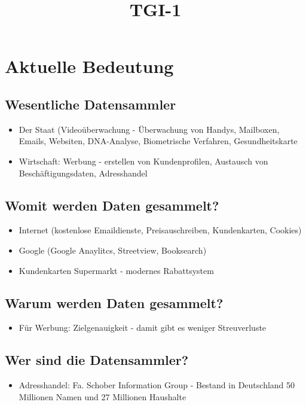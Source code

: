 \documentclass[a4paper,10pt]{scrartcl}
\title{TGI-1}
\author{}
\begin{document}
\section{Aktuelle Bedeutung}

\subsection{Wesentliche Datensammler}

\begin{itemize}
 \item Der Staat (Videoüberwachung - Überwachung von Handys, Mailboxen, Emails, Websiten, DNA-Analyse, Biometrische Verfahren, Gesundheitskarte
 \item Wirtschaft: Werbung - erstellen von Kundenprofilen, Austausch von Beschäftigungsdaten, Adresshandel
\end{itemize} 

\subsection{Womit werden Daten gesammelt?}

\begin{itemize}
 \item Internet (kostenlose Emaildienste, Preisauschreiben, Kundenkarten, Cookies)
 \item Google (Google Anaylitcs, Streetview, Booksearch)
 \item Kundenkarten Supermarkt - modernes Rabattsystem
\end{itemize}

\subsection{Warum werden Daten gesammelt?}

\begin{itemize}
 \item Für Werbung: Zielgenauigkeit - damit gibt es weniger Streuverluste
\end{itemize}

\subsection{Wer sind die Datensammler?}

\begin{itemize}
 \item Adresshandel: Fa. Schober Information Group - Bestand in Deutschland 
 50 Millionen Namen und 27 Millionen Haushalte
\end{itemize}
\end{document}

